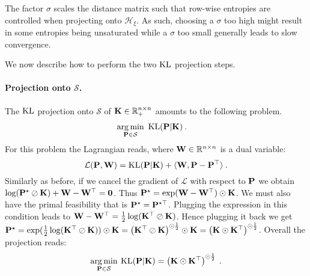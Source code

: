 The factor $\sigma$ scales the distance matrix such that row-wise entropies are controlled when projecting onto $\mathcal{H}_\xi$. As such, choosing a $\sigma$ too high might result in some entropies being unsaturated while a $\sigma$  too small generally leads to slow convergence.

We now describe how to perform the two $\operatorname{KL}$ projection steps. 



\paragraph{Projection onto $\mathcal{S}$.} The $\operatorname{KL}$ projection onto $\mathcal{S}$ of $\mathbf{K} \in \mathbb{R}_+^{n \times n}$ amounts to the following problem.
\begin{align}
    \operatorname*{arg\,min}_{\mathbf{P} \in \mathcal{S}} \ &\operatorname{KL}(\mathbf{P} | \mathbf{K}) \:.
\end{align}
For this problem the Lagrangian reads, where $\mathbf{W} \in \mathbb{R}^{n \times n}$ is a dual variable: 
\begin{equation}
\mathcal{L}(\mathbf{P}, \mathbf{W}) = \operatorname{KL}(\mathbf{P} | \mathbf{K}) +\langle \mathbf{W}, \mathbf{P} -\mathbf{P}^{\top} \rangle \:.
\end{equation}
Similarly as before, if we cancel the gradient of $\mathcal{L}$ with respect to $\mathbf{P}$ we obtain $\log(\mathbf{P}^\star \oslash \mathbf{K}) + \mathbf{W} - \mathbf{W}^\top = \bm{0}$. Thus $\mathbf{P}^\star = \exp( \mathbf{W}-\mathbf{W}^\top) \odot \mathbf{K}$. We must also have the primal feasibility that is $\mathbf{P}^\star = \mathbf{P}^{\star \top}$. Plugging the expression in this condition leads to $\mathbf{W} - \mathbf{W}^\top= \frac{1}{2} \log(\mathbf{K}^\top \oslash \mathbf{K})$. Hence plugging it back we get $\mathbf{P}^\star = \exp( \frac{1}{2} \log(\mathbf{K}^\top \oslash \mathbf{K})) \odot \mathbf{K} = \left(\mathbf{K}^\top \oslash \mathbf{K} \right)^{\odot \frac {1}{2}} \odot \mathbf{K} = \left(\mathbf{K} \odot \mathbf{K}^{\top}\right)^{\odot \frac {1}{2}}$. Overall the projection reads:
\begin{equation}
\operatorname*{arg\,min}_{\mathbf{P} \in \mathcal{S}} \: \operatorname{KL}(\mathbf{P} | \mathbf{K}) = \left(\mathbf{K} \odot \mathbf{K}^{\top}\right)^{\odot \frac{1}{2}} \:.
\end{equation}

